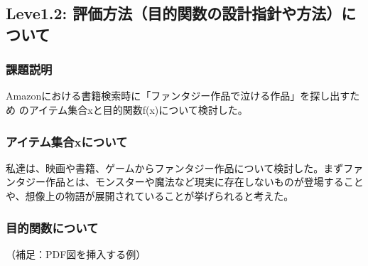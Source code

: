 \subsection{Leve1.2: 評価方法（目的関数の設計指針や方法）について}
\subsubsection{課題説明}
Amazonにおける書籍検索時に「ファンタジー作品で泣ける作品」を探し出すため
のアイテム集合xと目的関数f(x)について検討した。

\subsubsection{アイテム集合xについて}
私達は、映画や書籍、ゲームからファンタジー作品について検討した。まずファンタジー作品とは、モンスターや魔法など現実に存在しないものが登場することや、想像上の物語が展開されていることが挙げられると考えた。

\subsubsection{目的関数について}

（補足：PDF図を挿入する例）


